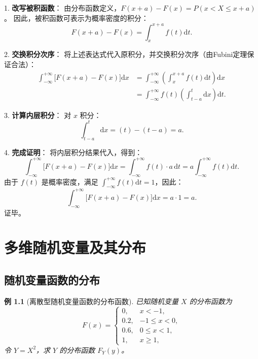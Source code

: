 \documentclass[11pt,a4paper,oneside,openany]{book}
\theoremstyle{yhbthm}
\newtheorem{example}{例}[section]
\begin{document}
1.  \textbf{改写被积函数}：
    由分布函数定义，$F(x+a) - F(x) = P(x < X \le x+a)$。
    因此，被积函数可表示为概率密度的积分：
    \[
    F(x+a) - F(x) = \int_{x}^{x+a} f(t) \mathrm{d}t.
    \]

2.  \textbf{交换积分次序}：
    将上述表达式代入原积分，并交换积分次序（由Fubini定理保证合法）：
    \[
    \begin{aligned}
    \int_{-\infty}^{+\infty} \bigl[F(x+a) - F(x)\bigr] \mathrm{d}x
    &= \int_{-\infty}^{+\infty} \left( \int_{x}^{x+a} f(t) \mathrm{d}t \right) \mathrm{d}x \\
    &= \int_{-\infty}^{+\infty} f(t) \left( \int_{t-a}^{t} \mathrm{d}x \right) \mathrm{d}t.
    \end{aligned}
    \]

3.  \textbf{计算内层积分}：
    对 $x$ 积分：
    \[
    \int_{t-a}^{t} \mathrm{d}x = (t) - (t-a) = a.
    \]

4.  \textbf{完成证明}：
    将内层积分结果代入，得到：
    \[
    \int_{-\infty}^{+\infty} \bigl[F(x+a) - F(x)\bigr] \mathrm{d}x
    = \int_{-\infty}^{+\infty} f(t) \cdot a \, \mathrm{d}t
    = a \int_{-\infty}^{+\infty} f(t) \mathrm{d}t.
    \]
    由于 $f(t)$ 是概率密度，满足 $\int_{-\infty}^{+\infty} f(t) \mathrm{d}t = 1$，因此：
    \[
    \int_{-\infty}^{+\infty} \bigl[F(x+a) - F(x)\bigr] \mathrm{d}x = a \cdot 1 = a.
    \]
    证毕。


\chapter{多维随机变量及其分布}
\section{随机变量函数的分布}

\begin{example}[离散型随机变量函数的分布函数]
已知随机变量 $X$ 的分布函数为
\[
F(x) =
\begin{cases}
0, & x < -1, \\
0.2, & -1 \le x < 0, \\
0.6, & 0 \le x < 1, \\
1, & x \ge 1,
\end{cases}
\]
令 $Y = X^2$，求 $Y$ 的分布函数 $F_Y(y)$。
\end{example}
\end{document}
